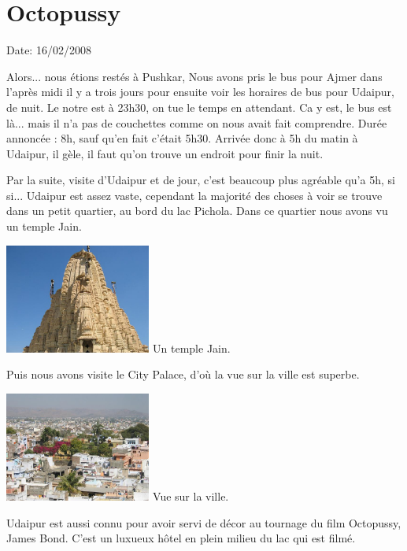 \section{Octopussy}

Date: 16/02/2008

\begin{multicols}{2}

Alors... nous étions restés à Pushkar, Nous avons pris le bus pour Ajmer dans l'après midi il y a trois jours pour ensuite voir les horaires de bus pour Udaipur, de nuit. Le notre est à 23h30, on tue le temps en attendant. Ca y est, le bus est là... mais il n'a pas de couchettes comme on nous avait fait comprendre. Durée annoncée : 8h, sauf qu'en fait c'était 5h30. Arrivée donc à 5h du matin à Udaipur, il gèle, il faut qu'on trouve un endroit pour finir la nuit.

Par la suite, visite d'Udaipur et de jour, c'est beaucoup plus agréable qu'a 5h, si si... Udaipur est assez vaste, cependant la majorité des choses à voir se trouve dans un petit quartier, au bord du lac Pichola. Dans ce quartier nous avons vu un temple Jain.

\hspace*{-0.65cm}
\includegraphics[width=4.8cm]{articles/Octopussy/jain.jpg}
Un temple Jain.

Puis nous avons visite le City Palace, d'où la vue sur la ville est superbe.

\hspace*{-0.65cm}
\includegraphics[width=4.8cm]{articles/Octopussy/zoomville.jpg}
Vue sur la ville.

Udaipur est aussi connu pour avoir servi de décor au tournage du film Octopussy, James Bond. C'est un luxueux hôtel en plein milieu du lac qui est filmé.


\end{multicols}
